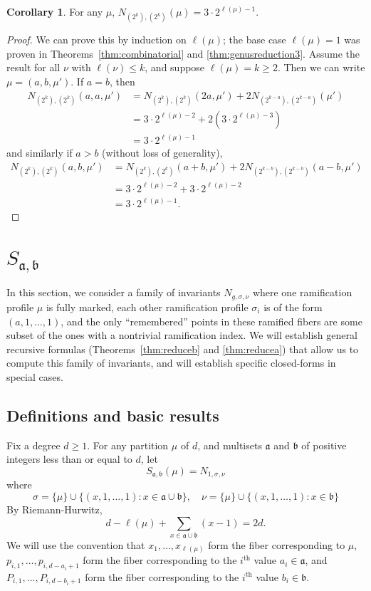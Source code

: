 \documentclass[11pt]{article}           %
\renewcommand{\a}{\mathfrak a}
\renewcommand{\b}{\mathfrak b}
\theoremstyle{definition}
\newtheorem{cor}[thm]{Corollary}
\begin{document}
\begin{cor}
  \label{cor:twos}
  For any $\mu$, $N_{(2^k),(2^k)}(\mu)=3\cdot 2^{\ell(\mu)-1}$.
\end{cor}
\begin{proof}
  We can prove this by induction on $\ell(\mu)$; the base case $\ell(\mu)=1$ was proven in Theorems~\ref{thm:combinatorial} and \ref{thm:genusreduction3}. Assume
  the result for all $\nu$ with $\ell(\nu)\leq k$, and suppose $\ell(\mu)=k\geq 2$.
  Then we can write $\mu=(a,b,\mu')$. If $a=b$, then
  \begin{align*}
    N_{(2^k),(2^k)}(a,a,\mu') &= N_{(2^k),(2^k)}(2a,\mu')+2N_{(2^{k-a}),(2^{k-a})}(\mu') \\
    &=3\cdot 2^{\ell(\mu)-2}+2(3\cdot 2^{\ell(\mu)-3}) \\
    &=3\cdot 2^{\ell(\mu)-1}
  \end{align*}
  and similarly if $a>b$ (without loss of generality),
    \begin{align*}
      N_{(2^k),(2^k)}(a,b,\mu') &= N_{(2^k),(2^k)}(a+b,\mu')+2N_{(2^{k-b}),(2^{k-b})}(a-b,\mu') \\
      &= 3\cdot 2^{\ell(\mu)-2}+3\cdot 2^{\ell(\mu)-2} \\
      &= 3\cdot 2^{\ell(\mu)-1}.
  \end{align*}
  \end{proof}

\section{$S_{\a,\b}$}

In this section, we consider a family of invariants $N_{g,\sigma,\nu}$ where
one ramification profile
$\mu$ is fully marked,
each other ramification profile $\sigma_i$ is of the form $(a,1,\dots,1)$, and
the only ``remembered'' points in these ramified fibers are some subset of the ones with
a nontrivial ramification index. We will establish general recursive formulas
(Theorems~\ref{thm:reduceb} and \ref{thm:reducea})
that allow us to compute this family of invariants, and will establish
specific closed-forms in special cases.


\subsection{Definitions and basic results}

Fix a degree $d\geq 1$. For any partition $\mu$ of $d$, and multisets $\a$ and $\b$ of
positive integers less than or equal to $d$, let
\[
S_{\a,\b}(\mu)=N_{1,\sigma,\nu}
\]
where
\[
\sigma=\{\mu\}\cup\{(x,1,\dots,1):x\in\a\cup\b\},\quad \nu=\{\mu\}\cup\{(x,1,\dots,1):x\in\b\}
\]
By Riemann-Hurwitz,
\[
d-\ell(\mu)+\sum_{x\in\a\cup\b}(x-1)=2d.
\]
We will use the convention that $x_1,\dots,x_{\ell(\mu)}$
form the fiber corresponding to $\mu$, $p_{i,1},\dots,p_{i,d-a_i+1}$ form
the fiber corresponding to the $i^{\text{th}}$ value $a_i\in\a$, and
$P_{i,1},\dots,P_{i,d-b_i+1}$ form the fiber corresponding to the
$i^{\text{th}}$ value $b_i\in\b$.
\end{document}
